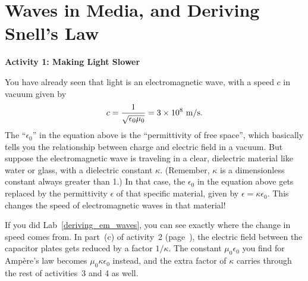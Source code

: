 \section{Waves in Media, and Deriving Snell's Law}


\makelabheader %

\bigskip
\textbf{Activity 1: Making Light Slower}

You have already seen that light is an electromagnetic wave, with a speed $c$ in vacuum given by
$$c = \frac{1}{\sqrt{\epsilon_0 \mu_0}}=3 \times 10^{8}~{\rm m/s}.$$
The ``$\epsilon_0$'' in the equation above is the ``permittivity of free space'', which basically tells you the relationship between charge and electric field in a vacuum.  But suppose the electromagnetic wave is traveling in a clear, dielectric material like water or glass, with a dielectric constant $\kappa$.  (Remember, $\kappa$ is a dimensionless constant always greater than 1.)  In that case, the $\epsilon_0$ in the equation above gets replaced by the permittivity $\epsilon$ of that specific material, given by $\epsilon = \kappa\epsilon_0$.  This changes the speed of electromagnetic waves in that material!

{If you did Lab~\ref{deriving_em_waves}, you can see exactly where the change in speed comes from.  In part~(c) of activity~2 (page~\pageref{part_ampere_field_between_plates}), the electric field between the capacitor plates gets reduced by a factor $1/\kappa$.  The constant $\mu_0\epsilon_0$ you find for Amp\`ere's law becomes $\mu_0\kappa\epsilon_0$ instead, and the extra factor of $\kappa$ carries through the rest of activities~3 and 4 as well.}
{}

